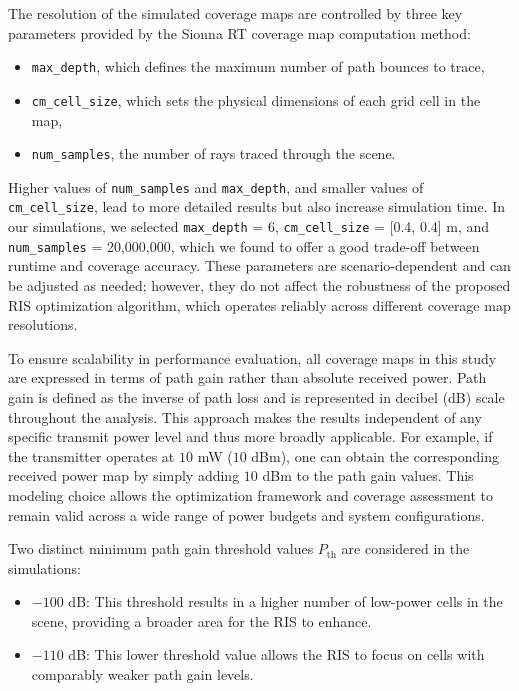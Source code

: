\documentclass{IEEEoj}
\begin{document}
The resolution of the simulated coverage maps are controlled by three key parameters provided by the Sionna RT coverage map computation method:
\begin{itemize}
	\item \texttt{max\_depth}, which defines the maximum number of path bounces to trace,
	\item \texttt{cm\_cell\_size}, which sets the physical dimensions of each grid cell in the map,
	\item \texttt{num\_samples}, the number of rays traced through the scene.
\end{itemize}
Higher values of \texttt{num\_samples} and \texttt{max\_depth}, and smaller values of \texttt{cm\_cell\_size}, lead to more detailed results but also increase simulation time. In our simulations, we selected \texttt{max\_depth} = 6, \texttt{cm\_cell\_size} = [0.4, 0.4] m, and \texttt{num\_samples} = 20,000,000, which we found to offer a good trade-off between runtime and coverage accuracy. These parameters are scenario-dependent and can be adjusted as needed; however, they do not affect the robustness of the proposed RIS optimization algorithm, which operates reliably across different coverage map resolutions.

To ensure scalability in performance evaluation, all coverage maps in this study are expressed in terms of path gain rather than absolute received power. Path gain is defined as the inverse of path loss and is represented in decibel (dB) scale throughout the analysis. This approach makes the results independent of any specific transmit power level and thus more broadly applicable. For example, if the transmitter operates at $10$ mW ($10$ dBm), one can obtain the corresponding received power map by simply adding $10$ dBm to the path gain values. This modeling choice allows the optimization framework and coverage assessment to remain valid across a wide range of power budgets and system configurations.

Two distinct minimum path gain threshold values $P_{\text{th}}$ are considered in the simulations:  
\begin{itemize}
	\item $-100$ dB: This threshold results in a higher number of low-power cells in the scene, providing a broader area for the RIS to enhance.
	\item $-110$ dB: This lower threshold value allows the RIS to focus on cells with comparably weaker path gain levels.
\end{itemize}
\end{document}
